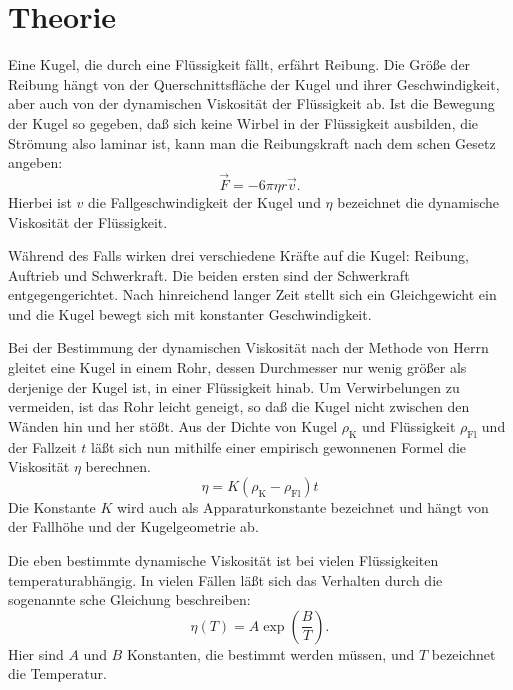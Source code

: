 \section{Theorie}
\let\name\relax

Eine Kugel, die durch eine Flüssigkeit fällt, erfährt Reibung. Die Größe
der Reibung hängt von der Querschnittsfläche der Kugel und ihrer
Geschwindigkeit, aber auch von der dynamischen Viskosität der
Flüssigkeit ab. Ist die Bewegung der Kugel so gegeben, daß sich keine
Wirbel in der Flüssigkeit ausbilden, die Strömung also laminar ist, kann
man die Reibungskraft nach dem \name{Stokes}schen Gesetz angeben:
\begin{equation}
  \label{eq:stokes}
  \vec{F} = -6 \pi \eta r \vec{v}.
\end{equation}
Hierbei ist $v$ die Fallgeschwindigkeit der Kugel und $\eta$ bezeichnet
die dynamische Viskosität der Flüssigkeit.

Während des Falls wirken drei verschiedene Kräfte auf die Kugel:
Reibung, Auftrieb und Schwerkraft. Die beiden ersten sind der
Schwerkraft entgegengerichtet. Nach hinreichend langer Zeit stellt sich
ein Gleichgewicht ein und die Kugel bewegt sich mit konstanter
Geschwindigkeit.

Bei der Bestimmung der dynamischen Viskosität nach der Methode von
Herrn \name{Höppler} gleitet eine Kugel in einem Rohr, dessen
Durchmesser nur wenig größer als derjenige der Kugel ist, in einer
Flüssigkeit hinab. Um Verwirbelungen zu vermeiden, ist das Rohr leicht
geneigt, so daß die Kugel nicht zwischen den Wänden hin und her stößt.
Aus der Dichte von Kugel $\rho_\text{K}$ und Flüssigkeit
$\rho_\text{Fl}$ und der Fallzeit $t$ läßt sich nun mithilfe einer
empirisch gewonnenen Formel die Viskosität $\eta$ berechnen.
\begin{equation}
  \label{eq:empirie}
  \eta = K(\rho_\text{K} - \rho_\text{Fl})t
\end{equation}
Die Konstante $K$ wird auch als Apparaturkonstante bezeichnet und hängt
von der Fallhöhe und der Kugelgeometrie ab.

Die eben bestimmte dynamische Viskosität ist bei vielen Flüssigkeiten
temperaturabhängig. In vielen Fällen läßt sich das Verhalten durch die
sogenannte \name{Andrade}sche Gleichung beschreiben:
\begin{equation}
  \label{eq:andrade}
  \eta(T) = A \exp \left( \frac{B}{T} \right).
\end{equation}
Hier sind $A$ und $B$ Konstanten, die bestimmt werden müssen, und $T$
bezeichnet die Temperatur.
